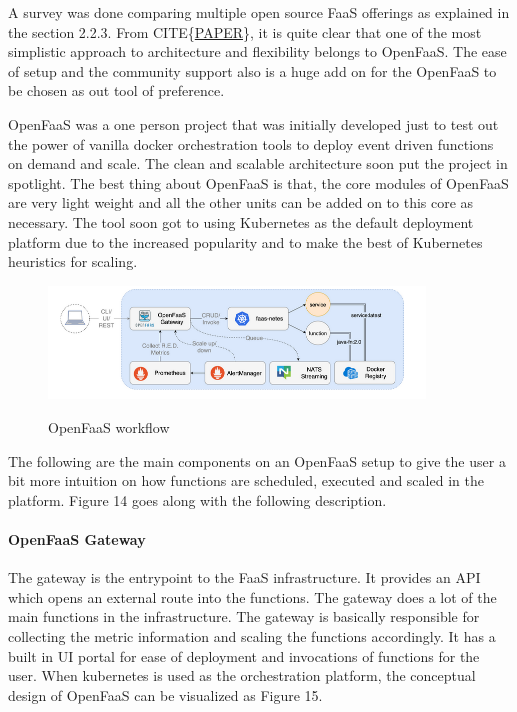 \documentclass[12pt,titlepage]{article}
\begin{document}
A survey was done comparing multiple open source FaaS offerings as explained in
the section 2.2.3. From CITE\{\href{https://arxiv.org/pdf/1911.07449.pdf}{PAPER}\}, it is quite clear that one of the most
simplistic approach to architecture and flexibility belongs to OpenFaaS. The
ease of setup and the community support also is a huge add on for the OpenFaaS
to be chosen as out tool of preference.

OpenFaaS was a one person project that was initially developed just to test out
the power of vanilla docker orchestration tools to deploy event driven functions
on demand and scale. The clean and scalable architecture soon put the project in
spotlight. The best thing about OpenFaaS is that, the core modules of OpenFaaS
are very light weight and all the other units can be added on to this core as
necessary. The tool soon got to using Kubernetes as the default deployment
platform due to the increased popularity and to make the best of Kubernetes
heuristics for scaling.

\begin{figure}[!h]
    \caption{OpenFaaS workflow}
    \centering
    \includegraphics[width=100mm]{./thesis_images/openfaas_workflow.png}
    \label{fig:Openfaas workflow}
\end{figure}

The following are the main components on an OpenFaaS setup to give the user a
bit more intuition on how functions are scheduled, executed and scaled in the
platform. Figure 14 goes along with the following description.

\paragraph{OpenFaaS Gateway}
\label{sec:orga7e996e}
The gateway is the entrypoint to the FaaS infrastructure. It provides an API
which opens an external route into the functions. The gateway does a lot of the
main functions in the infrastructure. The gateway is basically responsible for
collecting the metric information and scaling the functions accordingly. It has
a built in UI portal for ease of deployment and invocations of functions for the
user. When kubernetes is used as the orchestration platform, the conceptual
design of OpenFaaS can be visualized as Figure 15.
\end{document}
